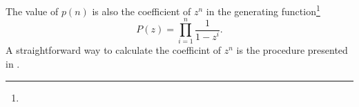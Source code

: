 The value of $p(n)$ is also the coefficient of $z^n$ in the generating
function\footnote{
}
\[
P(z)
=
\prod_{i=1}^n
\frac{
  1
}{
  1 - z^i
}.
\]
A straightforward way to calculate the coefficint of $z^n$ is the
procedure presented in .

\begin{algorithm}[!htbp]

\caption{%
  The number of ways to partition $n$.
}
\label{alg:sum:recurrence_relation}
\end{algorithm}
